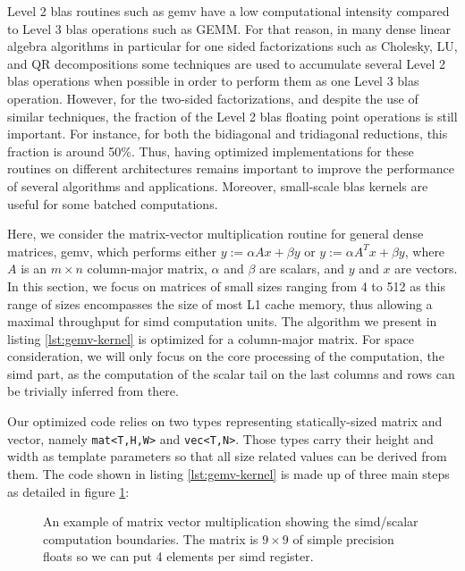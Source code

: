 \documentclass[../main]{subfiles}
\begin{document}
Level 2 \gls{blas} routines such as \gls{gemv} have a low
computational intensity compared to Level 3 \gls{blas} operations
such as GEMM. For that reason, in many dense linear algebra
algorithms in particular for one sided factorizations such as
Cholesky, LU, and QR decompositions some techniques are
used to accumulate several Level 2 \gls{blas} operations when
possible in order to perform them as one Level 3 \gls{blas}
operation\cite{hpcs18}. However, for the two-sided factorizations,
and despite the use of similar techniques, the fraction of the
Level 2 \gls{blas} floating point operations is still important. For
instance, for both the bidiagonal and tridiagonal reductions,
this fraction is around 50\%\cite{hpcs19}. Thus, having optimized
implementations for these routines on different architectures
remains important to improve the performance of several
algorithms and applications. Moreover, small-scale \gls{blas}
kernels are useful for some batched computations\cite{hpcs20}.

Here, we consider the matrix-vector multiplication routine
for general dense matrices, \gls{gemv}, which performs either
$y := \alpha A x + \beta y$ or $y := \alpha A ^T x + \beta y$,
where $A$ is an $m \times n$ column-major matrix, $\alpha$ and $\beta$
are scalars, and $y$ and $x$ are vectors. In this section,
we focus on matrices of small sizes ranging from
4 to 512 as this range of sizes encompasses the size of
most L1 cache memory, thus allowing a maximal throughput
for \gls{simd} computation units. The algorithm we present in
listing \ref{lst:gemv-kernel} is optimized for a column-major matrix.
For space consideration, we will only focus on the core processing of
the computation, \ie the \gls{simd} part, as the computation of
the scalar tail on the last columns and rows can be trivially
inferred from there.

Our optimized code relies on two types representing
statically-sized matrix and vector, namely \lstinline{mat<T,H,W>}
and \lstinline{vec<T,N>}. Those types carry their height and width
as template parameters so that all size related values can be
derived from them. The code shown in listing \ref{lst:gemv-kernel} is made up
of three main steps as detailed in figure \ref{fig:simd-gemv-illustration}:

\begin{figure}[h]
\fontsize{8}{10}\selectfont

\caption{
  An example of matrix vector multiplication showing the \gls{simd}/scalar
  computation boundaries. The matrix is $9 \times 9$ of simple precision floats
  so we can put 4 elements per \gls{simd} register.
}
\label{fig:simd-gemv-illustration}
\end{figure}
\end{document}
